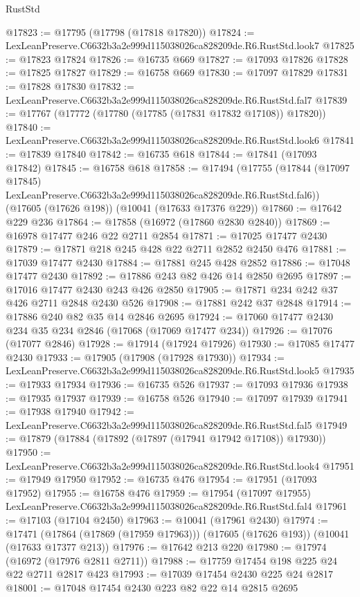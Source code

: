 \begin{lexlean}{RustStd}
\begin{coremodule}
@17823 := @17795 (@17798 (@17818 @17820))
@17824 := LexLeanPreserve.C6632b3a2e999d115038026ca828209de.R6.RustStd.look7
@17825 := @17823 @17824
@17826 := @16735 @669
@17827 := @17093 @17826
@17828 := @17825 @17827
@17829 := @16758 @669
@17830 := @17097 @17829
@17831 := @17828 @17830
@17832 := LexLeanPreserve.C6632b3a2e999d115038026ca828209de.R6.RustStd.fal7
@17839 := @17767 (@17772 (@17780 (@17785 (@17831 @17832 @17108)) @17820))
@17840 := LexLeanPreserve.C6632b3a2e999d115038026ca828209de.R6.RustStd.look6
@17841 := @17839 @17840
@17842 := @16735 @618
@17844 := @17841 (@17093 @17842)
@17845 := @16758 @618
@17858 := @17494
    (@17755
      (@17844 (@17097 @17845) LexLeanPreserve.C6632b3a2e999d115038026ca828209de.R6.RustStd.fal6))
    (@17605 (@17626 @198))
    (@10041 (@17633 @17376 @229))
@17860 := @17642 @229 @236
@17864 := @17858 (@16972 (@17860 @2830 @2840))
@17869 := @16978 @17477 @246 @22 @2711 @2854
@17871 := @17025 @17477 @2430
@17879 := @17871 @218 @245 @428 @22 @2711 @2852 @2450 @476
@17881 := @17039 @17477 @2430
@17884 := @17881 @245 @428 @2852
@17886 := @17048 @17477 @2430
@17892 := @17886 @243 @82 @426 @14 @2850 @2695
@17897 := @17016 @17477 @2430 @243 @426 @2850
@17905 := @17871 @234 @242 @37 @426 @2711 @2848 @2430 @526
@17908 := @17881 @242 @37 @2848
@17914 := @17886 @240 @82 @35 @14 @2846 @2695
@17924 := @17060 @17477 @2430 @234 @35 @234 @2846 (@17068 (@17069 @17477 @234))
@17926 := @17076 (@17077 @2846)
@17928 := @17914 (@17924 @17926)
@17930 := @17085 @17477 @2430
@17933 := @17905 (@17908 (@17928 @17930))
@17934 := LexLeanPreserve.C6632b3a2e999d115038026ca828209de.R6.RustStd.look5
@17935 := @17933 @17934
@17936 := @16735 @526
@17937 := @17093 @17936
@17938 := @17935 @17937
@17939 := @16758 @526
@17940 := @17097 @17939
@17941 := @17938 @17940
@17942 := LexLeanPreserve.C6632b3a2e999d115038026ca828209de.R6.RustStd.fal5
@17949 := @17879 (@17884 (@17892 (@17897 (@17941 @17942 @17108)) @17930))
@17950 := LexLeanPreserve.C6632b3a2e999d115038026ca828209de.R6.RustStd.look4
@17951 := @17949 @17950
@17952 := @16735 @476
@17954 := @17951 (@17093 @17952)
@17955 := @16758 @476
@17959 := @17954 (@17097 @17955) LexLeanPreserve.C6632b3a2e999d115038026ca828209de.R6.RustStd.fal4
@17961 := @17103 (@17104 @2450)
@17963 := @10041 (@17961 @2430)
@17974 := @17471
    (@17864 (@17869 (@17959 @17963)))
    (@17605 (@17626 @193))
    (@10041 (@17633 @17377 @213))
@17976 := @17642 @213 @220
@17980 := @17974 (@16972 (@17976 @2811 @2711))
@17988 := @17759 @17454 @198 @225 @24 @22 @2711 @2817 @423
@17993 := @17039 @17454 @2430 @225 @24 @2817
@18001 := @17048 @17454 @2430 @223 @82 @22 @14 @2815 @2695

\end{coremodule}
\end{lexlean}
